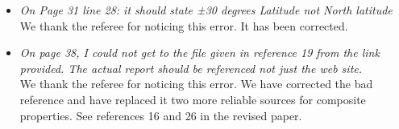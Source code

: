 \documentclass[10pt, a4paper]{article}
\begin{document}
\begin{itemize}
    \item \emph{On Page 31 line 28: it should state ±30 degrees Latitude not North latitude} \\

        We thank the referee for noticing this error.  It has been corrected. \\

    \item \emph{On page 38, I could not get to the file given in reference 19 from the link provided. The actual report should be referenced not just the web site.} \\

        We thank the referee for noticing this error.  We have corrected the bad reference and have replaced it two more reliable sources for composite properties.  See references 16 and 26 in the revised paper. \\
    \end{itemize}
\end{document}

